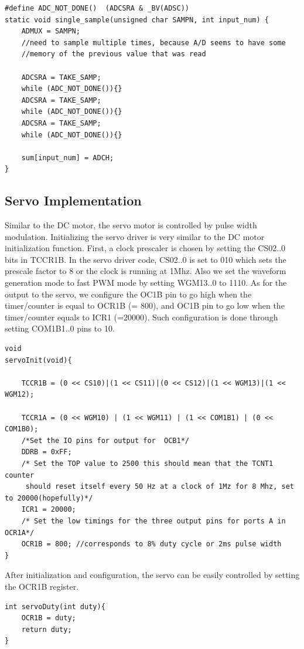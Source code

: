 \begin{lstlisting}[float=ht]
#define ADC_NOT_DONE() 	(ADCSRA & _BV(ADSC)) 
static void single_sample(unsigned char SAMPN, int input_num) {
	ADMUX = SAMPN;
	//need to sample multiple times, because A/D seems to have some
	//memory of the previous value that was read

	ADCSRA = TAKE_SAMP;
	while (ADC_NOT_DONE()){}
	ADCSRA = TAKE_SAMP;
	while (ADC_NOT_DONE()){}
	ADCSRA = TAKE_SAMP;
	while (ADC_NOT_DONE()){}

	sum[input_num] = ADCH;
}
\end{lstlisting}

\subsection{Servo Implementation}
Similar to the DC motor, the servo motor is controlled by pulse width modulation. Initializing the servo driver is very similar to the DC motor initialization function. First, a clock prescaler is chosen by setting the CS02..0 bits in TCCR1B. In the servo driver code, CS02..0 is set to 010 which sets the prescale factor to 8 or the clock is running at 1Mhz. Also we set the waveform generation mode to fast PWM mode by setting WGM13..0 to 1110. As for the output to the servo, we configure the OC1B pin to go high when the timer/counter is equal to OCR1B (= 800), and OC1B pin to go low when the timer/counter equals to ICR1 (=20000). Such configuration is done through setting COM1B1..0 pins to 10.

\begin{lstlisting}
void
servoInit(void){

	TCCR1B = (0 << CS10)|(1 << CS11)|(0 << CS12)|(1 << WGM13)|(1 << WGM12);

	TCCR1A = (0 << WGM10) | (1 << WGM11) | (1 << COM1B1) | (0 << COM1B0);
	/*Set the IO pins for output for  OCB1*/
	DDRB = 0xFF;
	/* Set the TOP value to 2500 this should mean that the TCNT1 counter
	 should reset itself every 50 Hz at a clock of 1Mz for 8 Mhz, set to 20000(hopefully)*/
	ICR1 = 20000;
	/* Set the low timings for the three output pins for ports A in OCR1A*/
	OCR1B = 800; //corresponds to 8% duty cycle or 2ms pulse width
}
\end{lstlisting}

After initialization and configuration, the servo can be easily controlled by setting the OCR1B register.

\begin{lstlisting}
int servoDuty(int duty){
	OCR1B = duty;
	return duty;
}
\end{lstlisting}

